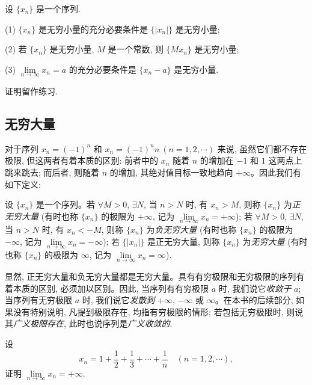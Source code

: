 \begin{theorem}\label{theorem:ma-2-1-1}
设 $\{x_n\}$ 是一个序列.

(1) $\{x_n\}$ 是无穷小量的充分必要条件是 $\{|x_n|\}$ 是无穷小量;

(2) 若 $\{x_n\}$ 是无穷小量, $M$ 是一个常数, 则 $\{Mx_n\}$ 是无穷小量;

(3) $\lim\limits_{n\to\infty}x_n=a$ 的充分必要条件是 $\{x_n-a\}$ 是无穷小量.
\end{theorem}

证明留作练习.

\subsection{无穷大量}
\label{subsec:ma-2-1-4}

对于序列 $x_n=(-1)^n$ 和 $x_n=(-1)^nn\ (n=1,2,\cdots)$ 来说, 虽然它们都不存在极限, 但这两者有着本质的区别: 前者中的 $x_n$ 随着 $n$ 的增加在 $-1$ 和 $1$ 这两点上跳来跳去; 而后者, 则随着 $n$ 的增加, 其绝对值目标一致地趋向 $+\infty$。因此我们有如下定义:

\begin{definition}\label{definition:ma-2-1-3}
设 $\{x_n\}$ 是一个序列。若 $\forall M>0$, $\exists N$, 当 $n>N$ 时, 有 $x_n>M$, 则称 $\{x_n\}$ 为\emph{正无穷大量} (有时也称 $\{x_n\}$ 的极限为 $+\infty$, 记为 $\lim\limits_{n\to\infty}x_n=+\infty$); 若 $\forall M>0$, $\exists N$, 当 $n>N$ 时, 有 $x_n<-M$, 则称 $\{x_n\}$ 为\emph{负无穷大量} (有时也称 $\{x_n\}$ 的极限为 $-\infty$, 记为 $\lim\limits_{n\to\infty}x_n=-\infty$); 若 $\{|x_n|\}$ 是正无穷大量, 则称 $\{x_n\}$ 为\emph{无穷大量} (有时也称 $\{x_n\}$ 的极限为 $\infty$, 记为 $\lim\limits_{n\to\infty}x_n=\infty$).
\end{definition}

显然, 正无穷大量和负无穷大量都是无穷大量。具有有穷极限和无穷极限的序列有着本质的区别, 必须加以区别。因此, 当序列有有穷极限 $a$ 时, 我们说它\emph{收敛于} $a$; 当序列有无穷极限 $a$ 时, 我们说它\emph{发散到} $+\infty$, $-\infty$ 或 $\infty$。在本书的后续部分, 如果没有特别说明, 凡提到极限存在, 均指有穷极限的情形; 若包括无穷极限时, 则说其\emph{广义极限存在}, 此时也说序列是\emph{广义收敛的}.

\begin{example}\label{example:ma-2-1-12}
设
\[
  x_n=1+\frac12+\frac13+\cdots+\frac1n\quad(n=1,2,\cdots),
\]
证明 $\lim\limits_{n\to\infty}x_n=+\infty$.
\end{example}


